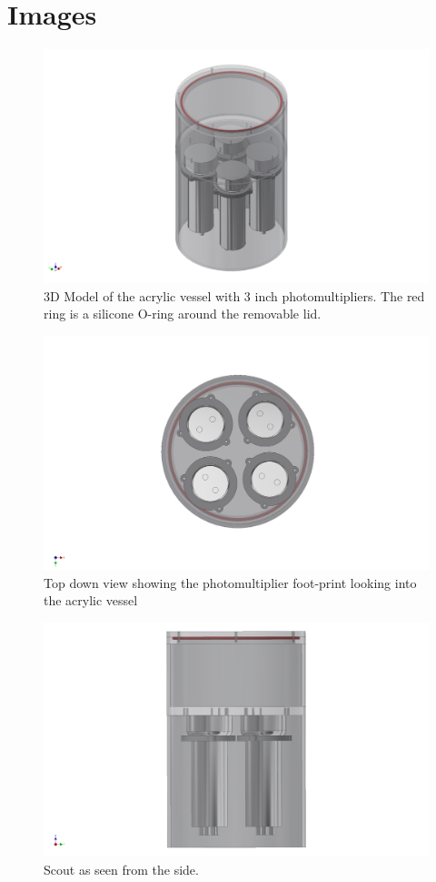 \documentclass[]{article}
\begin{document}
\section{Images}
\begin{figure}
  \includegraphics[width=\textwidth]{scout_vessel.pdf}
  \caption{3D Model of the acrylic vessel with 3 inch photomultipliers. The red ring is a silicone
  O-ring around the removable lid.}
\end{figure}
\begin{figure}
  \includegraphics[width=\textwidth]{scout_vessel1.pdf}
  \caption{Top down view showing the photomultiplier foot-print looking into the acrylic vessel}
\end{figure}
\begin{figure}
  \includegraphics[width=\textwidth]{scout_vessel2.pdf}
  \caption{Scout as seen from the side.}
\end{figure}
\end{document}
